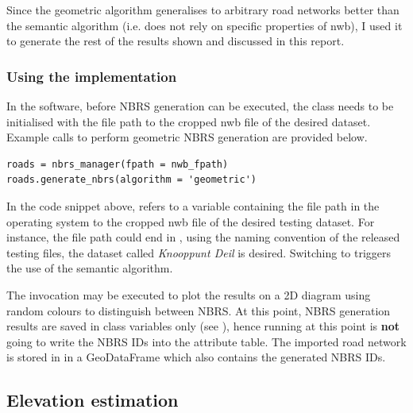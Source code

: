Since the geometric algorithm generalises to arbitrary road networks better than the semantic algorithm (i.e. does not rely on specific properties of \ac{nwb}), I used it to generate the rest of the results shown and discussed in this report.

\subsubsection{Using the implementation}

In the software, before NBRS generation can be executed, the  class needs to be initialised with the file path to the cropped \ac{nwb} file of the desired dataset. Example calls to perform geometric NBRS generation are provided below.

\begin{verbatim}
roads = nbrs_manager(fpath = nwb_fpath)
roads.generate_nbrs(algorithm = 'geometric')
\end{verbatim}

In the code snippet above,  refers to a variable containing the file path in the operating system to the cropped \ac{nwb} file of the desired testing dataset. For instance, the file path could end in , using the naming convention of the released testing files, the dataset called \textit{Knooppunt Deil} is desired. Switching to  triggers the use of the semantic algorithm.

The invocation  may be executed to plot the results on a 2D diagram using random colours to distinguish between NBRS. At this point, NBRS generation results are saved in class variables only (see ), hence running  at this point is \textbf{not} going to write the NBRS IDs into the attribute table. The imported road network is stored in  in a GeoDataFrame which also contains the generated NBRS IDs.

\subsection{Elevation estimation}
\label{sub:r_elevationestimation}

